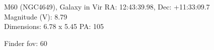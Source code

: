 \begin{block}{M60 (NGC4649), Galaxy in Vir}
    RA: 12:43:39.98, Dec: +11:33:09.7 \\ 
    Magnitude (V): 8.79 \\ 
    Dimensions: 6.78 x 5.45 PA: 105 

    Finder fov: 60 
\end{block}